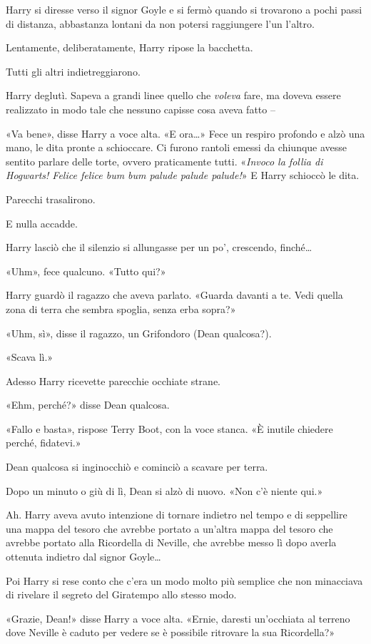 Harry si diresse verso il signor Goyle e si fermò quando si trovarono a pochi passi di distanza, abbastanza lontani da non potersi raggiungere l’un l’altro.

Lentamente, deliberatamente, Harry ripose la bacchetta.

Tutti gli altri indietreggiarono.

Harry deglutì. Sapeva a grandi linee quello che \textit{voleva} fare, ma doveva essere realizzato in modo tale che nessuno capisse cosa aveva fatto –

«Va bene», disse Harry a voce alta. «E ora…» Fece un respiro profondo e alzò una mano, le dita pronte a schioccare. Ci furono rantoli emessi da chiunque avesse sentito parlare delle torte, ovvero praticamente tutti. «\textit{Invoco la follia di Hogwarts! Felice felice bum bum palude palude palude!}» E Harry schioccò le dita.

Parecchi trasalirono.

E nulla accadde.

Harry lasciò che il silenzio si allungasse per un po’, crescendo, finché…

«Uhm», fece qualcuno. «Tutto qui?»

Harry guardò il ragazzo che aveva parlato. «Guarda davanti a te. Vedi quella zona di terra che sembra spoglia, senza erba sopra?»

«Uhm, sì», disse il ragazzo, un Grifondoro (Dean qualcosa?).

«Scava lì.»

Adesso Harry ricevette parecchie occhiate strane.

«Ehm, perché?» disse Dean qualcosa.

«Fallo e basta», rispose Terry Boot, con la voce stanca. «È inutile chiedere perché, fidatevi.»

Dean qualcosa si inginocchiò e cominciò a scavare per terra.

Dopo un minuto o giù di lì, Dean si alzò di nuovo. «Non c’è niente qui.»

Ah. Harry aveva avuto intenzione di tornare indietro nel tempo e di seppellire una mappa del tesoro che avrebbe portato a un’altra mappa del tesoro che avrebbe portato alla Ricordella di Neville, che avrebbe messo lì dopo averla ottenuta indietro dal signor Goyle…

Poi Harry si rese conto che c’era un modo molto più semplice che non minacciava di rivelare il segreto del Giratempo allo stesso modo.

«Grazie, Dean!» disse Harry a voce alta. «Ernie, daresti un’occhiata al terreno dove Neville è caduto per vedere se è possibile ritrovare la sua Ricordella?»

